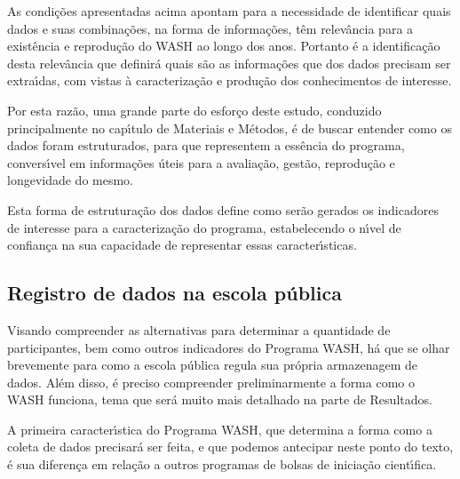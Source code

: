 \documentclass[
12pt,		%
openright,	%
twoside,  %
a4paper,			%
chapter=TITLE,		%
english,			%
french,				%
spanish,			%
brazil				%
]{USPSC-classe/USPSC}
\begin{document}
As condi\c{c}\~oes apresentadas acima apontam para a necessidade de identificar quais dados e suas combina\c{c}\~oes, na forma de informa\c{c}\~oes, t\^em relev\^ancia para a exist\^encia e reprodu\c{c}\~ao do WASH ao longo dos anos. Portanto \'e a identifica\c{c}\~ao desta relev\^ancia que definir\'a quais s\~ao as informa\c{c}\~oes que dos dados precisam ser extra\'{\i}das, com vistas \`a  caracteriza\c{c}\~ao e produ\c{c}\~ao dos conhecimentos de interesse.








Por esta raz\~ao, uma grande parte do esfor\c{c}o deste estudo, conduzido principalmente no cap\'{\i}tulo de Materiais e M\'etodos, \'e de buscar entender como os dados foram estruturados, para que representem a ess\^encia do programa, convers\'{\i}vel em informa\c{c}\~oes \'uteis para a avalia\c{c}\~ao, gest\~ao, reprodu\c{c}\~ao e longevidade do mesmo.








Esta forma de estrutura\c{c}\~ao dos dados define como ser\~ao gerados os indicadores de interesse para a caracteriza\c{c}\~ao do programa, estabelecendo o n\'{\i}vel de confian\c{c}a na sua capacidade de representar essas caracter\'{\i}sticas.








\subsection[Registro de dados na escola p\'ublica]{Registro de dados na escola p\'ublica}\label{Registro de dados na escola p\'ublica}
Visando compreender as alternativas para determinar a quantidade de participantes, bem como outros indicadores do Programa WASH, h\'a que se olhar brevemente para como a escola p\'ublica regula sua pr\'opria armazenagem de dados. Al\'em disso, \'e preciso compreender preliminarmente a forma como o WASH funciona, tema que ser\'a muito mais detalhado na parte de Resultados.








A primeira caracter\'{\i}stica do Programa WASH, que determina a forma como a coleta de dados precisar\'a ser feita, e que podemos antecipar neste ponto do texto, \'e sua diferen\c{c}a em rela\c{c}\~ao a outros programas de bolsas de inicia\c{c}\~ao cient\'{\i}fica.
\end{document}

